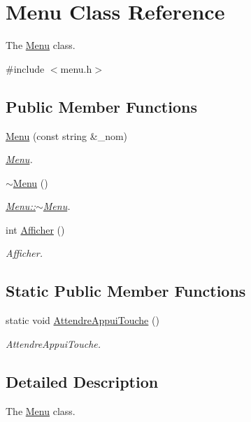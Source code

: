 \hypertarget{class_menu}{}\section{Menu Class Reference}
\label{class_menu}


The \hyperlink{class_menu}{Menu} class.  




{\ttfamily \#include $<$menu.\+h$>$}

\subsection*{Public Member Functions}
\begin{DoxyCompactItemize}
\item 
\hyperlink{class_menu_a2733b73d7c4dff4b1db19afd45f255b9}{Menu} (const string \&\+\_\+nom)
\begin{DoxyCompactList}\small\item\em \hyperlink{class_menu}{Menu}. \end{DoxyCompactList}\item 
\hyperlink{class_menu_a831387f51358cfb88cd018e1777bc980}{$\sim$\+Menu} ()
\begin{DoxyCompactList}\small\item\em \hyperlink{class_menu_a831387f51358cfb88cd018e1777bc980}{Menu\+::$\sim$\+Menu}. \end{DoxyCompactList}\item 
int \hyperlink{class_menu_a079e0c6a24248a07993b48b310ba65ce}{Afficher} ()
\begin{DoxyCompactList}\small\item\em Afficher. \end{DoxyCompactList}\end{DoxyCompactItemize}
\subsection*{Static Public Member Functions}
\begin{DoxyCompactItemize}
\item 
static void \hyperlink{class_menu_a6ddcaabf2fedb30f5136f3be655d60ce}{Attendre\+Appui\+Touche} ()
\begin{DoxyCompactList}\small\item\em Attendre\+Appui\+Touche. \end{DoxyCompactList}\end{DoxyCompactItemize}


\subsection{Detailed Description}
The \hyperlink{class_menu}{Menu} class. 

